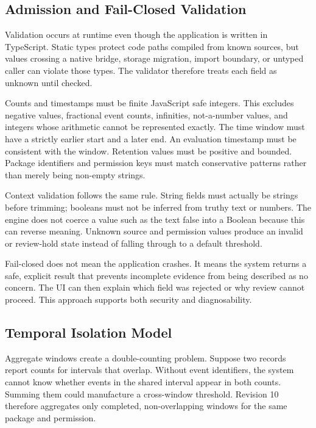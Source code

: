 \subsection{Admission and Fail-Closed Validation}

Validation occurs at runtime even though the application is written in TypeScript. Static types protect code paths compiled from known sources, but values crossing a native bridge, storage migration, import boundary, or untyped caller can violate those types. The validator therefore treats each field as unknown until checked.

Counts and timestamps must be finite JavaScript safe integers. This excludes negative values, fractional event counts, infinities, not-a-number values, and integers whose arithmetic cannot be represented exactly. The time window must have a strictly earlier start and a later end. An evaluation timestamp must be consistent with the window. Retention values must be positive and bounded. Package identifiers and permission keys must match conservative patterns rather than merely being non-empty strings.

Context validation follows the same rule. String fields must actually be strings before trimming; booleans must not be inferred from truthy text or numbers. The engine does not coerce a value such as the text false into a Boolean because this can reverse meaning. Unknown source and permission values produce an invalid or review-hold state instead of falling through to a default threshold.

Fail-closed does not mean the application crashes. It means the system returns a safe, explicit result that prevents incomplete evidence from being described as no concern. The UI can then explain which field was rejected or why review cannot proceed. This approach supports both security and diagnosability.

\subsection{Temporal Isolation Model}

Aggregate windows create a double-counting problem. Suppose two records report counts for intervals that overlap. Without event identifiers, the system cannot know whether events in the shared interval appear in both counts. Summing them could manufacture a cross-window threshold. Revision 10 therefore aggregates only completed, non-overlapping windows for the same package and permission.


